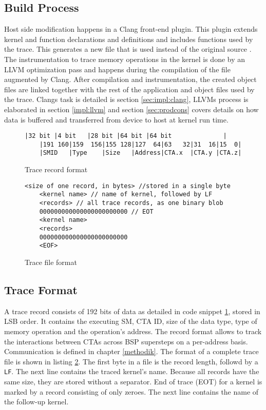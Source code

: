 \subsection{Build Process}
Host side modification happens in a Clang front-end plugin. This plugin extends kernel and function declarations and definitions and includes functions used by the trace. This generates a new file that is used instead of the original source . The instrumentation to trace memory operations in the kernel is done by an LLVM optimization pass and happens during the compilation of the file augmented by Clang. After compilation and instrumentation, the created object files are linked together with the rest of the application and object files used by the trace.
Clangs task is detailed is section \ref{sec:impl:clang}, LLVMs process is elaborated in section \ref{impl:llvm} and section \ref{sec:prodcons} covers details on how data is buffered and transferred from device to host at kernel run time.
\begin{figure}[t]
	\begin{lstlisting}[style=C]
	|32 bit |4 bit   |28 bit |64 bit |64 bit        	  |
	|191 160|159  156|155 128|127  64|63   32|31  16|15  0|
	|SMID   |Type    |Size   |Address|CTA.x  |CTA.y |CTA.z|	\end{lstlisting}
	\caption{Trace record format}
	\label{trace rec}
\end{figure}
\begin{figure}[t]
	\begin{lstlisting}[style=C]
	<size of one record, in bytes> //stored in a single byte
	<kernel name> // name of kernel, followed by LF
	<records> // all trace records, as one binary blob
	000000000000000000000000 // EOT
	<kernel name>
	<records>
	000000000000000000000000
	<EOF>	\end{lstlisting}
	\caption{Trace file format}
	\label{trace file}
\end{figure}
\subsection{Trace Format}
A trace record consists of 192 bits of data as detailed in code snippet \ref{trace rec}, stored in LSB order. It contains the executing SM, CTA ID, size of the data type, type of memory operation and the operation's address. The record format allows to track the interactions between CTAs across BSP supersteps on a per-address basis. Communication is defined in chapter \ref{methodik}.
The format of a complete trace file is shown in listing \ref{trace file}. The first byte in a file is the record length, followd by a \verb|LF|. The next line contains the
traced kernel's name. Because all records have the same size, they are stored without a separator. End of trace (EOT) for a kernel is marked by a record consisting of only zeroes. The next line contains the name of the follow-up kernel.




